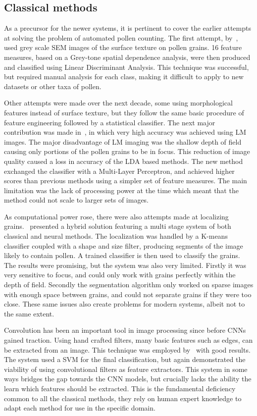 \subsection{Classical methods}
As a precursor for the newer systems, it is pertinent to cover the earlier attempts at solving the problem of automated pollen counting.
The first attempt, by~\cite{langford_computerized_1990}, used grey scale SEM images of the surface texture on pollen grains. 16 feature measures, based on a Grey-tone spatial dependence analysis, were then produced and classified using Linear Discriminant Analysis.
This technique was successful, but required manual analysis for each class, making it difficult to apply to new datasets or other taxa of pollen.

Other attempts were made over the next decade, some using morphological features instead of surface texture, but they follow the same basic procedure of feature engineering followed by a statistical classifier.
The next major contribution was made in~\cite{li_pollen_1999}, in which very high accuracy was achieved using LM images.
The major disadvantage of LM imaging was the shallow depth of field causing only portions of the pollen grains to be in focus.
This reduction of image quality caused a loss in accuracy of the LDA based methods.
The new method exchanged the classifier with a Multi-Layer Perceptron, and achieved higher scores than previous methods using a simpler set of feature measures.
The main limitation was the lack of processing power at the time which meant that the method could not scale to larger sets of images.

As computational power rose, there were also attempts made at localizing grains.\ \cite{france_new_2000} presented a hybrid solution featuring a multi stage system of both classical and neural methods.
The localization was handled by a K-means classifier coupled with a shape and size filter, producing segments of the image likely to contain pollen.
A trained classifier is then used to classify the grains.
The results were promising, but the system was also very limited.
Firstly it was very sensitive to focus, and could only work with grains perfectly within the depth of field.
Secondly the segmentation algorithm only worked on sparse images with enough space between grains, and could not separate grains if they were too close.
These same issues also create problems for modern systems, albeit not to the same extent.

Convolution has been an important tool in image processing since before CNNs gained traction.
Using hand crafted filters, many basic features such as edges, can be extracted from an image.
This technique was employed by\ \cite{DaoodICPR16b} with good results.
The system used a SVM for the final classification, but again demonstrated the viability of using convolutional filters as feature extractors.
This system in some ways bridges the gap towards the CNN models, but crucially lacks the ability the learn which features should be extracted.
This is the fundamental deficiency common to all the classical methods, they rely on human expert knowledge to adapt each method for use in the specific domain.

